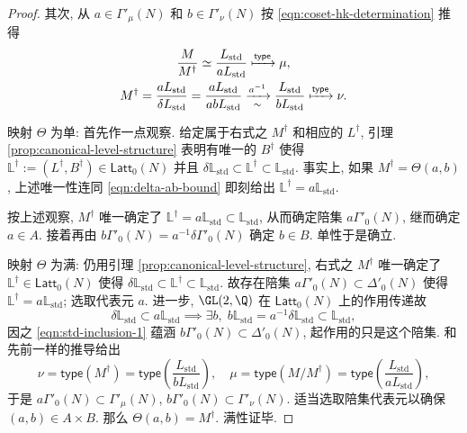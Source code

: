 \begin{proof}
	其次, 从 $a \in \Gamma'_\mu(N)$ 和 $b \in \Gamma'_\nu(N)$ 按 \eqref{eqn:coset-hk-determination} 推得
	\begin{gather*}
		\dfrac{M}{M^\dagger} \simeq \dfrac{L_{\text{std}}}{aL_{\text{std}}} \xmapsto{\mathsf{type}} \mu, \\
		M^\dagger = \frac{a L_{\text{std}}}{\delta L_{\text{std}}} = \frac{a L_{\text{std}}}{ab L_{\text{std}}} \xrightarrow[\sim]{a^{-1}} \frac{L_{\text{std}}}{b L_{\text{std}}} \xmapsto{\mathsf{type}} \nu.
	\end{gather*}

	映射 $\Theta$ 为单: 首先作一点观察. 给定属于右式之 $M^\dagger$ 和相应的 $L^\dagger$, 引理 \ref{prop:canonical-level-structure} 表明有唯一的 $B^\dagger$ 使得 $\mathbb{L}^\dagger := (L^\dagger, B^\dagger) \in \mathsf{Latt}_0(N)$ 并且 $\delta\mathbb{L}_{\text{std}} \subset \mathbb{L}^\dagger \subset \mathbb{L}_{\text{std}}$. 事实上, 如果 $M^\dagger = \Theta(a,b)$, 上述唯一性连同 \eqref{eqn:delta-ab-bound} 即刻给出 $\mathbb{L}^\dagger = a\mathbb{L}_{\text{std}}$.
	
	按上述观察, $M^\dagger$ 唯一确定了 $\mathbb{L}^\dagger = a\mathbb{L}_{\text{std}} \subset \mathbb{L}_{\text{std}}$, 从而确定陪集 $a \Gamma'_0(N)$, 继而确定 $a \in A$. 接着再由 $b\Gamma'_0(N) = a^{-1} \delta \Gamma'_0(N)$ 确定 $b \in B$. 单性于是确立.

	映射 $\Theta$ 为满: 仍用引理 \ref{prop:canonical-level-structure}, 右式之 $M^\dagger$ 唯一确定了 $\mathbb{L}^\dagger \in \mathsf{Latt}_0(N)$ 使得 $\delta \mathbb{L}_{\text{std}} \subset \mathbb{L}^\dagger \subset \mathbb{L}_{\text{std}}$. 故存在陪集 $a\Gamma'_0(N) \subset \Delta'_0(N)$ 使得 $\mathbb{L}^\dagger = a\mathbb{L}_{\text{std}}$; 选取代表元 $a$. 进一步, $\GL(2,\Q)$ 在 $\mathsf{Latt}_0(N)$ 上的作用传递故
	\[ \delta\mathbb{L}_{\text{std}} \subset a\mathbb{L}_{\text{std}} \implies \exists b, \; b\mathbb{L}_{\text{std}} = a^{-1}\delta \mathbb{L}_{\text{std}} \subset \mathbb{L}_{\text{std}}, \]
	因之 \eqref{eqn:std-inclusion-1} 蕴涵 $b\Gamma'_0(N) \subset \Delta'_0(N)$, 起作用的只是这个陪集. 和先前一样的推导给出
	\[ \nu = \mathsf{type}(M^\dagger) = \mathsf{type}\left(\frac{L_{\text{std}}}{bL_{\text{std}}}\right), \quad \mu = \mathsf{type}(M/M^\dagger) = \mathsf{type}\left(\frac{L_{\text{std}}}{aL_{\text{std}}}\right), \]
	于是 $a\Gamma'_0(N) \subset \Gamma'_\mu(N)$, $b\Gamma'_0(N) \subset \Gamma'_\nu(N)$. 适当选取陪集代表元以确保 $(a,b) \in A \times B$. 那么 $\Theta(a,b) = M^\dagger$. 满性证毕.
\end{proof}

